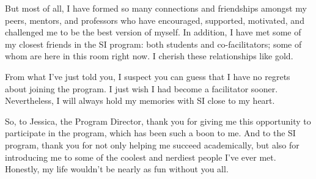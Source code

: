 \documentclass{article}
\begin{document}
But most of all, I have formed so many connections and friendships amongst my
peers, mentors, and professors who have encouraged, supported,
motivated, and challenged me to be the best version of myself. In addition, I
have met some of my closest friends in the SI program: both students and
co-facilitators; some of whom are here in this room right now.  I cherish these
relationships like gold.

From what I've just told you, I suspect you can guess that I have no regrets
about joining the program.  I just wish I had become a facilitator sooner.
Nevertheless, I will always hold my memories with SI close to my heart.

So, to Jessica, the Program Director, thank you for giving me this opportunity
to participate in the program, which has been such a boon to me. And to the SI
program, thank you for not only helping me succeed academically, but also
for introducing me to some of the coolest and nerdiest people I've ever met.
Honestly, my life wouldn't be nearly as fun without you all.
\end{document}
